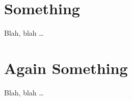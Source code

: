 \chapter{Something}\label{sec:something}

Blah, blah \dots

 \cleardoublepage


\chapter{Again Something}\label{sec:again_something}

Blah, blah \dots

 \cleardoublepage
